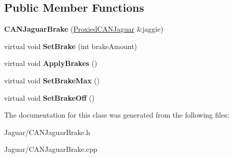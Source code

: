 \subsection*{\-Public \-Member \-Functions}
\begin{DoxyCompactItemize}
\item 
\hypertarget{class_c_a_n_jaguar_brake_a7a368a45df056712d2aa7c9894246d32}{
{\bfseries \-C\-A\-N\-Jaguar\-Brake} (\hyperlink{class_proxied_c_a_n_jaguar}{\-Proxied\-C\-A\-N\-Jaguar} \&jaggie)}
\label{class_c_a_n_jaguar_brake_a7a368a45df056712d2aa7c9894246d32}

\item 
\hypertarget{class_c_a_n_jaguar_brake_a611880152debf07bdedee19fa84b9dd2}{
virtual void {\bfseries \-Set\-Brake} (int brake\-Amount)}
\label{class_c_a_n_jaguar_brake_a611880152debf07bdedee19fa84b9dd2}

\item 
\hypertarget{class_c_a_n_jaguar_brake_a0294a04f1c18d3e254751bd698f6dd55}{
virtual void {\bfseries \-Apply\-Brakes} ()}
\label{class_c_a_n_jaguar_brake_a0294a04f1c18d3e254751bd698f6dd55}

\item 
\hypertarget{class_c_a_n_jaguar_brake_a4c336b82f4794b3076cebd1544c976fb}{
virtual void {\bfseries \-Set\-Brake\-Max} ()}
\label{class_c_a_n_jaguar_brake_a4c336b82f4794b3076cebd1544c976fb}

\item 
\hypertarget{class_c_a_n_jaguar_brake_ad1f81faa5328875d3ba3b02bdd6416e1}{
virtual void {\bfseries \-Set\-Brake\-Off} ()}
\label{class_c_a_n_jaguar_brake_ad1f81faa5328875d3ba3b02bdd6416e1}

\end{DoxyCompactItemize}


\-The documentation for this class was generated from the following files\-:\begin{DoxyCompactItemize}
\item 
\-Jaguar/\-C\-A\-N\-Jaguar\-Brake.\-h\item 
\-Jaguar/\-C\-A\-N\-Jaguar\-Brake.\-cpp\end{DoxyCompactItemize}
